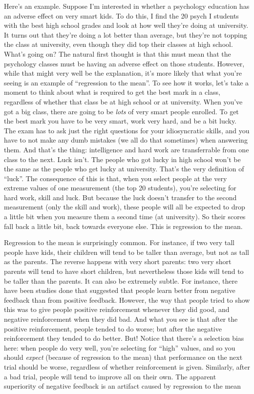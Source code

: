 \documentclass[]{book}
\begin{document}
Here's an example. Suppose I'm interested in whether a psychology education has an adverse effect on very smart kids. To do this, I find the 20 psych I students with the best high school grades and look at how well they're doing at university. It turns out that they're doing a lot better than average, but they're not topping the class at university, even though they did top their classes at high school. What's going on? The natural first thought is that this must mean that the psychology classes must be having an adverse effect on those students. However, while that might very well be the explanation, it's more likely that what you're seeing is an example of ``regression to the mean''. To see how it works, let's take a moment to think about what is required to get the best mark in a class, regardless of whether that class be at high school or at university. When you've got a big class, there are going to be {\emph{lots}} of very smart people enrolled. To get the best mark you have to be very smart, work very hard, and be a bit lucky. The exam has to ask just the right questions for your idiosyncratic skills, and you have to not make any dumb mistakes (we all do that sometimes) when answering them. And that's the thing: intelligence and hard work are transferrable from one class to the next. Luck isn't. The people who got lucky in high school won't be the same as the people who get lucky at university. That's the very definition of ``luck''. The consequence of this is that, when you select people at the very extreme values of one measurement (the top 20 students), you're selecting for hard work, skill and luck. But because the luck doesn't transfer to the second measurement (only the skill and work), these people will all be expected to drop a little bit when you measure them a second time (at university). So their scores fall back a little bit, back towards everyone else. This is regression to the mean.

Regression to the mean is surprisingly common. For instance, if two very tall people have kids, their children will tend to be taller than average, but not as tall as the parents. The reverse happens with very short parents: two very short parents will tend to have short children, but nevertheless those kids will tend to be taller than the parents. It can also be extremely subtle. For instance, there have been studies done that suggested that people learn better from negative feedback than from positive feedback. However, the way that people tried to show this was to give people positive reinforcement whenever they did good, and negative reinforcement when they did bad. And what you see is that after the positive reinforcement, people tended to do worse; but after the negative reinforcement they tended to do better. But! Notice that there's a selection bias here: when people do very well, you're selecting for ``high'' values, and so you should {\emph{expect}} (because of regression to the mean) that performance on the next trial should be worse, regardless of whether reinforcement is given. Similarly, after a bad trial, people will tend to improve all on their own. The apparent superiority of negative feedback is an artifact caused by regression to the mean \citep{Kahneman1973}
\end{document}
